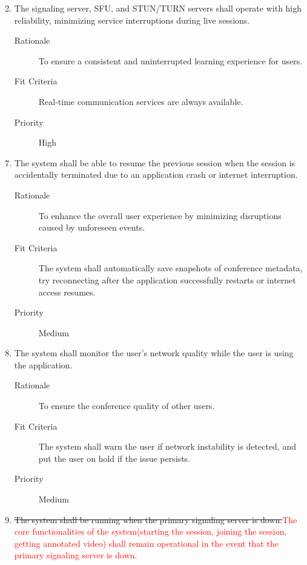 \documentclass{article}
\begin{document}
\begin{enumerate}[PR1]
  \setcounter{enumi}{1}
\item The signaling server, SFU, and STUN/TURN servers shall operate with high
  reliability, minimizing service interruptions during live
  sessions. \label{PR2}
  \begin{description}
  \item[Rationale] To ensure a consistent and uninterrupted learning experience for users.
  \item[Fit Criteria] Real-time communication services are always available.
  \item[Priority] High
  \end{description}
\end{enumerate}
\begin{enumerate}[label=\textbf{PR\arabic*}]
  \setcounter{enumi}{6}
\item The system shall be able to resume the previous session when the session is
  accidentally terminated due to an application crash or internet interruption.
  \label{PR7}
	\begin{description}
  \item[Rationale] To enhance the overall user experience by minimizing disruptions
    caused by unforeseen events.
	\item[Fit Criteria] The system shall automatically save snapshots of conference
    metadata, try reconnecting after the application successfully restarts or
    internet access resumes.
	\item[Priority] Medium
  \end{description}
\item The system shall monitor the user's network quality while the user is using
  the application. \label{PR8}
	\begin{description}
  \item[Rationale] To ensure the conference quality of other users.
	\item[Fit Criteria] The system shall warn the user if network instability is
    detected, and put the user on hold if the issue persists.
	\item[Priority] Medium
  \end{description}
\item \sout{The system shall be running when the primary signaling server is
  down.}\textcolor{red}{The core functionalities of the system(starting the session, 
  joining the session, getting annotated video) shall remain operational in the 
  event that the primary signaling server is down.} \label{PR9}

\end{enumerate}
\end{document}
